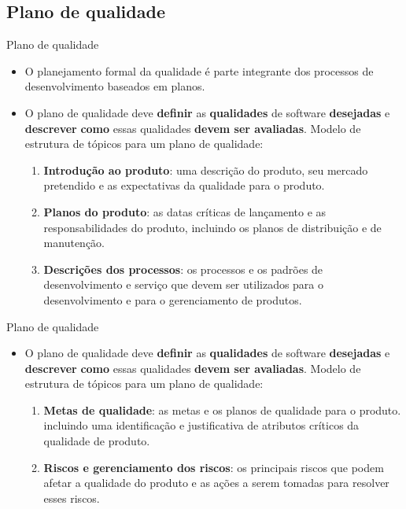 \documentclass{beamer}
\begin{document}
\subsection{Plano de qualidade}

\begin{frame}{Plano de qualidade}
	\begin{itemize}
		\justifying
		\item<1> O planejamento formal da qualidade é parte integrante dos processos de desenvolvimento baseados em planos.
		\item<2-> O plano de qualidade deve \textbf{definir} as \textbf{qualidades} de software \textbf{desejadas} e \textbf{descrever} \textbf{como} essas qualidades \textbf{devem ser avaliadas}. Modelo de estrutura de tópicos para um plano de qualidade:
		\begin{enumerate}
			\justifying
			\item<3> \textbf{Introdução ao produto}: uma descrição do produto, seu mercado pretendido e as expectativas da qualidade para o produto.
			\item<4> \textbf{Planos do produto}: as datas críticas de lançamento e as responsabilidades do produto, incluindo os planos de distribuição e de manutenção.
			\item<5> \textbf{Descrições dos processos}: os processos e os padrões de desenvolvimento e serviço que devem ser utilizados para o desenvolvimento e para o gerenciamento de produtos.
		\end{enumerate}
	\end{itemize}
\end{frame}

\begin{frame}{Plano de qualidade}
	\begin{itemize}
		\justifying
		\item O plano de qualidade deve \textbf{definir} as \textbf{qualidades} de software \textbf{desejadas} e \textbf{descrever} \textbf{como} essas qualidades \textbf{devem ser avaliadas}. Modelo de estrutura de tópicos para um plano de qualidade:
		\begin{enumerate}
			\justifying
			\setcounter{enumi}{3}
			\item<1> \textbf{Metas de qualidade}: as metas e os planos de qualidade para o produto. incluindo uma identificação e justificativa de atributos críticos da qualidade de produto.
			\item<2> \textbf{Riscos e gerenciamento dos riscos}: os principais riscos que podem afetar a qualidade do produto e as ações a serem tomadas para resolver esses riscos.
		\end{enumerate}
	\end{itemize}
\end{frame}
\end{document}
